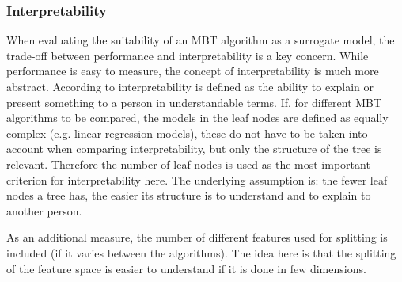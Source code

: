 \vspace{0.5cm}
\subsubsection{Interpretability}
When evaluating the suitability of an MBT algorithm as a surrogate model, the trade-off between performance and interpretability is a key concern. While performance is easy to measure, the concept of interpretability is much more abstract.
According to \citet{DoshiVelez.2017} interpretability is defined as the ability to explain or present something to a person in understandable terms. If, for different MBT algorithms to be compared, the models in the leaf nodes are defined as equally complex (e.g. linear regression models), these do not have to be taken into account when comparing interpretability, but only the structure of the tree is relevant. Therefore the number of leaf nodes is used as the most important criterion for interpretability here.  The underlying assumption is: the fewer leaf nodes a tree has, the easier its structure is to understand and to explain to another person.

As an additional measure, the number of different features used for splitting is included (if it varies between the algorithms). The idea here is that the splitting of the feature space is easier to understand if it is done in few dimensions.



